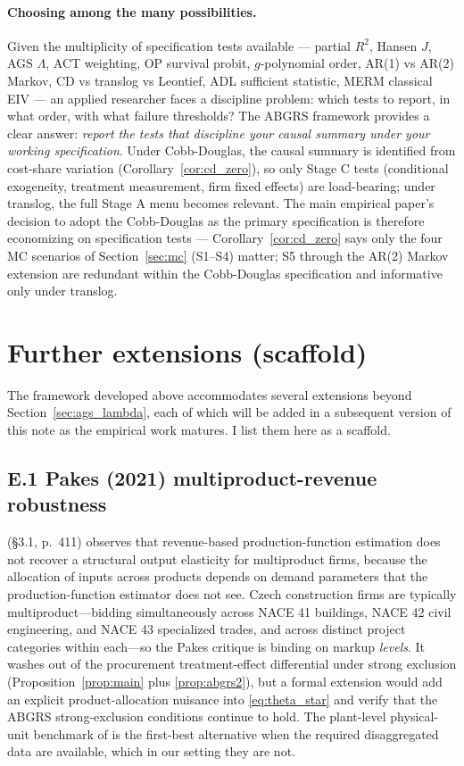 \documentclass[11pt]{article}
\begin{document}
\paragraph{Choosing among the many possibilities.} Given the multiplicity of specification tests available --- partial $R^2$, Hansen $J$, AGS $\Lambda$, ACT weighting, OP survival probit, $g$-polynomial order, AR(1) vs AR(2) Markov, CD vs translog vs Leontief, ADL sufficient statistic, MERM classical EIV --- an applied researcher faces a discipline problem: which tests to report, in what order, with what failure thresholds? The ABGRS framework provides a clear answer: \emph{report the tests that discipline your causal summary under your working specification}. Under Cobb-Douglas, the causal summary is identified from cost-share variation (Corollary~\ref{cor:cd_zero}), so only Stage C tests (conditional exogeneity, treatment measurement, firm fixed effects) are load-bearing; under translog, the full Stage A menu becomes relevant. The main empirical paper's decision to adopt the Cobb-Douglas as the primary specification is therefore economizing on specification tests --- Corollary~\ref{cor:cd_zero} says only the four MC scenarios of Section~\ref{sec:mc} (S1--S4) matter; S5 through the AR(2) Markov extension are redundant within the Cobb-Douglas specification and informative only under translog.

\section{Further extensions (scaffold)}\label{sec:extensions}

The framework developed above accommodates several extensions beyond Section~\ref{sec:ags_lambda}, each of which will be added in a subsequent version of this note as the empirical work matures. I list them here as a scaffold.

\subsection*{E.1 Pakes (2021) multiproduct-revenue robustness}

\citet{Pakes2021AnnRev} (§3.1, p.~411) observes that revenue-based production-function estimation does not recover a structural output elasticity for multiproduct firms, because the allocation of inputs across products depends on demand parameters that the production-function estimator does not see. Czech construction firms are typically multiproduct---bidding simultaneously across NACE 41 buildings, NACE 42 civil engineering, and NACE 43 specialized trades, and across distinct project categories within each---so the Pakes critique is binding on markup \emph{levels}. It washes out of the procurement treatment-effect differential under strong exclusion (Proposition~\ref{prop:main} plus \ref{prop:abgrs2}), but a formal extension would add an explicit product-allocation nuisance into \eqref{eq:theta_star} and verify that the ABGRS strong-exclusion conditions continue to hold. The plant-level physical-unit benchmark of \citet{BrandtJiangLuoSu2022} is the first-best alternative when the required disaggregated data are available, which in our setting they are not.
\end{document}
